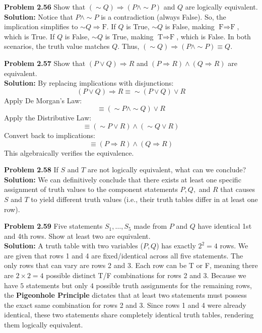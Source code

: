 \documentclass{article}
\begin{document}
\vspace{1em}
\textbf{Problem 2.56} Show that $(\sim Q) \Rightarrow (P \land \sim P)$ and $Q$ are logically equivalent.
\\[0.5em]
\textbf{Solution:} Notice that $P \land \sim P$ is a contradiction (always False).
So, the implication simplifies to $\sim Q \Rightarrow \text{F}$. 
If $Q$ is True, $\sim Q$ is False, making $\text{F} \Rightarrow \text{F}$, which is True.
If $Q$ is False, $\sim Q$ is True, making $\text{T} \Rightarrow \text{F}$, which is False.
In both scenarios, the truth value matches $Q$. Thus, $(\sim Q) \Rightarrow (P \land \sim P) \equiv Q$.

\vspace{1em}
\textbf{Problem 2.57} Show that $(P \lor Q) \Rightarrow R$ and $(P \Rightarrow R) \land (Q \Rightarrow R)$ are equivalent.
\\[0.5em]
\textbf{Solution:} By replacing implications with disjunctions:
\[ (P \lor Q) \Rightarrow R \equiv \sim(P \lor Q) \lor R \]
Apply De Morgan's Law:
\[ \equiv (\sim P \land \sim Q) \lor R \]
Apply the Distributive Law:
\[ \equiv (\sim P \lor R) \land (\sim Q \lor R) \]
Convert back to implications:
\[ \equiv (P \Rightarrow R) \land (Q \Rightarrow R) \]
This algebraically verifies the equivalence.

\vspace{1em}
\textbf{Problem 2.58} If $S$ and $T$ are not logically equivalent, what can we conclude?
\\[0.5em]
\textbf{Solution:} We can definitively conclude that there exists at least one specific assignment of truth values to the component statements $P, Q,$ and $R$ that causes $S$ and $T$ to yield different truth values (i.e., their truth tables differ in at least one row).

\vspace{1em}
\textbf{Problem 2.59} Five statements $S_1, \dots, S_5$ made from $P$ and $Q$ have identical 1st and 4th rows. Show at least two are equivalent.
\\[0.5em]
\textbf{Solution:} A truth table with two variables ($P, Q$) has exactly $2^2 = 4$ rows. We are given that rows 1 and 4 are fixed/identical across all five statements. The only rows that can vary are rows 2 and 3. Each row can be T or F, meaning there are $2 \times 2 = 4$ possible distinct T/F combinations for rows 2 and 3. Because we have $5$ statements but only $4$ possible truth assignments for the remaining rows, the \textbf{Pigeonhole Principle} dictates that at least two statements must possess the exact same combination for rows 2 and 3. Since rows 1 and 4 were already identical, these two statements share completely identical truth tables, rendering them logically equivalent.
\end{document}

